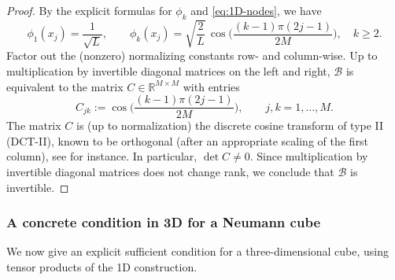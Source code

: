 \documentclass[11pt,a4paper]{article}
\numberwithin{equation}{section}
\theoremstyle{definition}
\newtheorem{remark}[theorem]{Remark}
\newcommand{\1}{\mathbbm{1}}
\begin{document}
\begin{proof}
By the explicit formulas for $\phi_k$ and \eqref{eq:1D-nodes}, we have
\[
\phi_1(x_j) = \frac{1}{\sqrt{L}},\qquad
\phi_k(x_j) = \sqrt{\frac{2}{L}}\,
\cos\!\Big(\frac{(k-1)\pi(2j-1)}{2M}\Big),\quad k\ge2.
\]
Factor out the (nonzero) normalizing constants row- and column-wise. Up to
multiplication by invertible diagonal matrices on the left and right,
$\mathcal{B}$ is equivalent to the matrix $C\in\mathbb{R}^{M\times M}$ with
entries
\[
C_{jk} := \cos\!\Big(\frac{(k-1)\pi(2j-1)}{2M}\Big),
\qquad j,k=1,\dots,M.
\]
The matrix $C$ is (up to normalization) the discrete cosine transform of type
II (DCT-II), known to be orthogonal (after an appropriate scaling of the first
column), see \cite{StrangBanks} for instance. In particular, $\det C\neq0$. Since multiplication by invertible
diagonal matrices does not change rank, we conclude that $\mathcal{B}$ is
invertible.
\end{proof}


\subsubsection*{A concrete condition in 3D for a Neumann cube}
\noindent
We now give an explicit sufficient condition for a three-dimensional cube,
using tensor products of the 1D construction.
\end{document}
